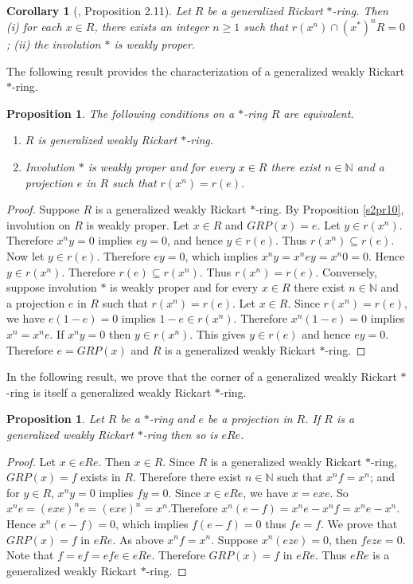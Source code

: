 \documentclass[11pt, one side,emlines]{amsart}
\newtheorem{proposition}[lemma]{Proposition}
\newtheorem{corollary}[lemma]{Corollary}
\theoremstyle{definition}
\numberwithin{equation}{section} \thispagestyle{empty} \voffset
\begin{document}
\begin{corollary}[\cite{ahmadigen2021}, Proposition 2.11] Let $R$ be a generalized Rickart $*$-ring. Then\\
	(i) for each $x\in R$, there exists an integer $n \geq 1$ such that $r(x^n) \cap (x^*)^nR = 0 $;
	(ii) the involution $*$ is weakly proper.
\end{corollary}

The following result provides the characterization of a generalized weakly Rickart $*$-ring.

\begin{proposition} \label{s2pr11} The following conditions on a $*$-ring $R$ are equivalent.
	\begin{enumerate}
		\item $R$ is generalized weakly Rickart $*$-ring. 
		\item Involution $*$ is weakly proper and for every $ x\in R$ there exist
		 $n\in\mathbb N$ and a projection $e$ in $R$ such that $r(x^n)=r(e)$.		
	\end{enumerate}
\end{proposition}
\begin{proof} Suppose $R$ is a generalized weakly Rickart $ *$-ring.
	By Proposition \ref{s2pr10}, involution on $R$ is weakly proper.
	Let $ x\in R $ and  $GRP(x)=e$.	Let $y\in r(x^n)$.
	Therefore $x^ny=0$ implies $ey=0$, and hence $y\in r(e)$. Thus $r(x^n)\subseteq r(e)$.
	Now let $ y\in r(e)$. Therefore $ey=0$, which implies $x^ny=x^ney=x^n0=0$.
	Hence $y\in r(x^n)$. Therefore $r(e) \subseteq r(x^n)$.	Thus $r(x^n)=r(e)$.
    Conversely, suppose involution $*$ is weakly proper and for every $ x\in R$ there exist
    $n\in\mathbb N$ and a projection $e$ in $R$ such that $r(x^n)=r(e)$.
	Let $x\in R$. Since $r(x^n)=r(e)$, we have $e(1-e)=0$ implies $1-e\in r(x^n)$. 
	Therefore  $x^n(1-e)=0$ implies $x^n=x^ne$.
	If $x^ny=0$ then $y \in r(x^n)$. This gives $y\in r(e)$ and hence $ey=0$.
	Therefore $e=GRP(x)$ and $R$ is a generalized weakly Rickart $*$-ring.
\end{proof}

  In the following result, we prove that the corner of a generalized weakly Rickart $*$-ring is itself a generalized weakly Rickart $*$-ring.
  
\begin{proposition} \label{s2pr12} Let $R$ be a $*$-ring  and $e$ be a projection in $R$. If $R$ is a generalized weakly Rickart $*$-ring then so is $eRe$.
\end{proposition}
\begin{proof} Let $x\in eRe$. Then $x \in R $. Since $R$ is a generalized weakly Rickart $*$-ring,
	$GRP(x)=f$ exists in $R$.
	Therefore there exist $n \in \mathbb N$ such that $x^nf=x^n$; and for $y\in R$, $x^ny=0$ implies $fy=0$.
	Since $x\in eRe$, we have $x=exe$. So $x^ne=(exe)^ne=(exe)^n=x^n$.Therefore $x^n(e-f) =x^ne-x^nf=x^ne-x^n$. 
	 Hence $x^n(e-f) =0$, which implies $f(e-f)=0$ thus $fe=f$.
	 We prove that $GRP(x)=f$ in $eRe$.
    As above $x^nf=x^n$. 	
	 Suppose $x^n(eze)=0$, then $feze=0$. Note that $f=ef=efe\in eRe$.
     Therefore  $GRP(x)=f$ in $eRe$.
	Thus $eRe$ is a generalized weakly Rickart $*$-ring.
\end{proof}
\end{document}

